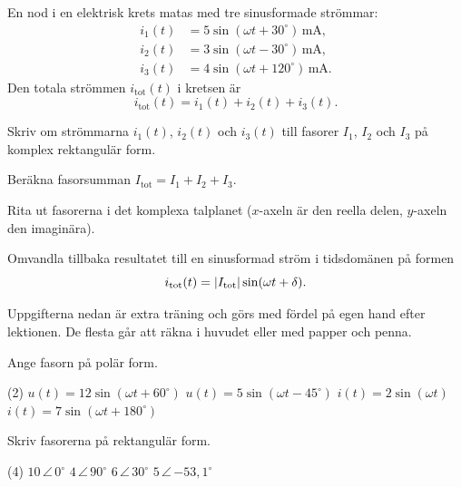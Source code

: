 
En nod i en elektrisk krets matas med tre sinusformade strömmar:
\begin{align*}
  i_1(t) &= 5\sin(\omega t + 30^{\circ})\,\text{mA}, \\
  i_2(t) &= 3\sin(\omega t - 30^{\circ})\,\text{mA}, \\
  i_3(t) &= 4\sin(\omega t + 120^{\circ})\,\text{mA}.
\end{align*}
Den totala strömmen $i_{\text{tot}}(t)$ i kretsen är
\[
  i_{\text{tot}}(t) = i_1(t) + i_2(t) + i_3(t).
\]
\begin{parts}
  \item Skriv om strömmarna $i_1(t)$, $i_2(t)$ och $i_3(t)$ till fasorer $I_1$, $I_2$ och $I_3$ på
    komplex rektangulär form.
  \item Beräkna fasorsumman $I_{\text{tot}} = I_1 + I_2 + I_3$.
  \item Rita ut fasorerna i det komplexa talplanet ($x$-axeln är den reella delen, $y$-axeln den
    imaginära).
  \item Omvandla tillbaka resultatet till en sinusformad ström i tidsdomänen på formen
    \[
      i_{\text{tot}}(t) = \lvert I_{\text{tot}}\rvert\sin(\omega t + \delta).
    \]
\end{parts}

Uppgifterna nedan är extra träning och görs med fördel på egen hand efter lektionen. De flesta går
att räkna i huvudet eller med papper och penna.

Ange fasorn på polär form.
\begin{delar}(2)
  \task $u(t) = 12\sin(\omega t + 60^{\circ})$
  \task $u(t) = 5\sin(\omega t - 45^{\circ})$
  \task $i(t) = 2\sin(\omega t)$
  \task $i(t) = 7\sin(\omega t + 180^{\circ})$
\end{delar}

Skriv fasorerna på rektangulär form.
\begin{delar}(4)
  \task $10\,\angle\,0^{\circ}$
  \task $4\,\angle\,90^{\circ}$
  \task $6\,\angle\,30^{\circ}$
  \task $5\,\angle\,{-53{,}1^{\circ}}$
\end{delar}

